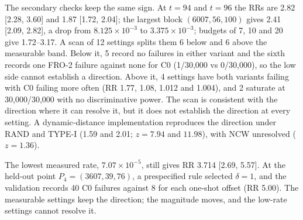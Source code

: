 The secondary checks keep the same sign. At $t=94$ and $t=96$ the RRs are 2.82 [2.28, 3.60] and 1.87 [1.72, 2.04]; the largest block $(6007,56,100)$ gives 2.41 [2.09, 2.82], a drop from $8.125\times10^{-3}$ to $3.375\times10^{-3}$; budgets of 7, 10 and 20 give 1.72--3.17. A scan of 12 settings splits them 6 below and 6 above the measurable band. Below it, 5 record no failures in either variant and the sixth records one FRO-2 failure against none for C0 (1/30{,}000 vs 0/30{,}000), so the low side cannot establish a direction. Above it, 4 settings have both variants failing with C0 failing more often (RR 1.77, 1.08, 1.012 and 1.004), and 2 saturate at 30{,}000/30{,}000 with no discriminative power. The scan is consistent with the direction where it can resolve it, but it does not establish the direction at every setting. A dynamic-distance implementation reproduces the direction under RAND and TYPE-I (1.59 and 2.01; $z=7.94$ and $11.98$), with NCW unresolved ($z=1.36$).

The lowest measured rate, $7.07\times10^{-5}$, still gives RR 3.714 [2.69, 5.57]. At the held-out point $P_4=(3607,39,76)$, a prespecified rule selected $\delta=1$, and the validation records 40 C0 failures against 8 for each one-shot offset (RR 5.00). The measurable settings keep the direction; the magnitude moves, and the low-rate settings cannot resolve it.

